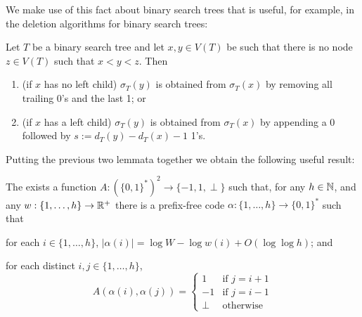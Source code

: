 \documentclass[kpfonts]{patmorin}
\begin{document}
We make use of this fact about binary search trees that is useful, for example, in the deletion algorithms for binary search trees:

\begin{lem}
  Let $T$ be a binary search tree and let $x,y\in V(T)$ be such that there is no node $z\in V(T)$ such that $x<y<z$.  Then
  \begin{enumerate}
    \item (if $x$ has no left child) $\sigma_T(y)$ is obtained from $\sigma_T(x)$ by removing all trailing 0's and the last 1; or
    \item (if $x$ has a left child) $\sigma_T(y)$ is obtained from $\sigma_T(x)$ by appending a 0 followed by $s:=d_T(y)-d_T(x)-1$ 1's.
  \end{enumerate}
\end{lem}

Putting the previous two lemmata together we obtain the following useful result:

\begin{lem}
  The exists a function $A:(\{0,1\}^*)^2\to\{-1,1,\perp\}$ such that, for any $h\in\mathbb{N}$, and any $w:\{1,\ldots,h\}\to\mathbb{R}^+$ there is a prefix-free code $\alpha:\{1,\ldots,h\}\to \{0,1\}^*$ such that 
  \begin{compactenum}
    \item for each $i\in\{1,\ldots,h\}$, $|\alpha(i)|=\log W -\log w(i) + O(\log\log h)$; and
    \item for each distinct $i,j\in\{1,\ldots,h\}$, 
    \[   A(\alpha(i),\alpha(j)) 
    = \begin{cases}
       1 & \text{if $j=i+1$} \\
       -1 & \text{if $j=i-1$} \\
       \perp & \text{otherwise}
      \end{cases}
      \]
    \end{compactenum}
\end{lem}
\end{document}
